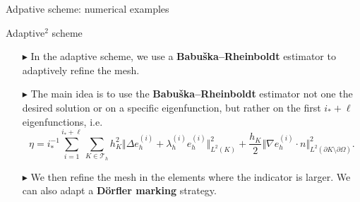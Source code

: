 \documentclass[]{beamer}
\newcommand{\oxarrow}{\color{oxfordblue}$\blacktriangleright$}
\begin{document}
\begin{frame}{Adpative scheme: numerical examples}
{\begin{figure}
		\end{figure}
		}
	\end{frame}
	\begin{frame}{Adaptive$^2$ scheme}
	\begin{itemize}
		\item[\oxarrow] In the adaptive scheme, we use a \textbf{Babuška--Rheinboldt} estimator to adaptively refine the mesh.
		\item[\oxarrow] The main idea is to use the \textbf{Babuška--Rheinboldt} estimator not one the desired solution or on a specific eigenfunction, but rather on the first $i_{\ast}+\ell$ eigenfunctions, i.e.
		\begin{equation*}
			\eta\! =\! i_{\ast}^{-1}\!\!\sum_{i = 1}^{i_{\ast}+\ell} \sum_{K \in \mathcal{T}_h}\! h^2_K \Vert \Delta e_h^{(i)} \!+\!\lambda_h^{(i)} e_h^{(i)} \Vert^2_{L^2(K)} \!+\! \frac{h_K}{2} \Vert \nabla e_h^{(i)}\! \cdot n \Vert^2_{L^2(\partial K \setminus \partial \Omega)}.
		\end{equation*}
		\item[\oxarrow] We then refine the mesh in the elements where the indicator is larger. We can also adapt a \textbf{D\"orfler marking} strategy.
	\end{itemize} 
	\end{frame}
\end{document}
